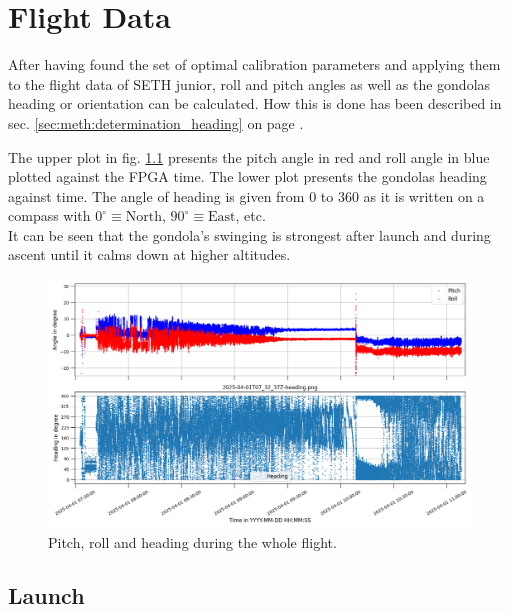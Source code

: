 \chapter{Flight Data \label{ch:flight_data}}
After having found the set of optimal calibration parameters and applying them to the flight data of \ac{SETH} junior, roll and pitch angles as well as the gondolas heading or orientation can be calculated. How this is done has been described in sec. \ref{sec:meth:determination_heading} on page \pageref{sec:meth:determination_heading}.

The upper plot in fig. \ref{fig:res:flight_heading} presents the pitch angle in red and roll angle in blue plotted against the \ac{FPGA} time. The lower plot presents the gondolas heading against time. The angle of heading is given from 0 to 360 as it is written on a compass with $0^\circ\equiv\mathrm{North}$, $90^\circ\equiv\mathrm{East}$, etc.\\
It can be seen that the gondola's swinging is strongest after launch and during ascent until it calms down at higher altitudes.

\begin{figure}[H]
    \centering
    \includegraphics[width=\linewidth]{images/04_results/flight_heading.png}
    \caption{Pitch, roll and heading during the whole flight.}
    \label{fig:res:flight_heading}
\end{figure}

\section{Launch \label{sec:launch}}

